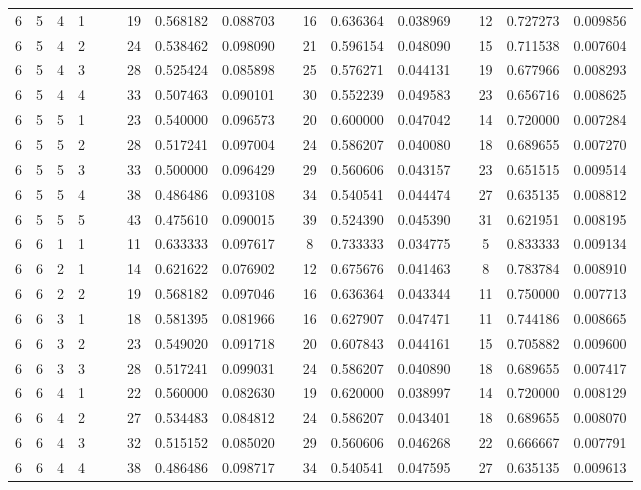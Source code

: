 \begin{appendix}
\begin{longtable}[h]{rrrcccccccccccccc}
6	&	5	&	4	&	1	&&&	19	&	0.568182	&	0.088703	&&	16	&	0.636364	&	0.038969	&&	12	&	0.727273	&	0.009856	\\
6	&	5	&	4	&	2	&&&	24	&	0.538462	&	0.098090	&&	21	&	0.596154	&	0.048090	&&	15	&	0.711538	&	0.007604	\\
6	&	5	&	4	&	3	&&&	28	&	0.525424	&	0.085898	&&	25	&	0.576271	&	0.044131	&&	19	&	0.677966	&	0.008293	\\
6	&	5	&	4	&	4	&&&	33	&	0.507463	&	0.090101	&&	30	&	0.552239	&	0.049583	&&	23	&	0.656716	&	0.008625	\\
6	&	5	&	5	&	1	&&&	23	&	0.540000	&	0.096573	&&	20	&	0.600000	&	0.047042	&&	14	&	0.720000	&	0.007284	\\
6	&	5	&	5	&	2	&&&	28	&	0.517241	&	0.097004	&&	24	&	0.586207	&	0.040080	&&	18	&	0.689655	&	0.007270	\\
6	&	5	&	5	&	3	&&&	33	&	0.500000	&	0.096429	&&	29	&	0.560606	&	0.043157	&&	23	&	0.651515	&	0.009514	\\
6	&	5	&	5	&	4	&&&	38	&	0.486486	&	0.093108	&&	34	&	0.540541	&	0.044474	&&	27	&	0.635135	&	0.008812	\\
6	&	5	&	5	&	5	&&&	43	&	0.475610	&	0.090015	&&	39	&	0.524390	&	0.045390	&&	31	&	0.621951	&	0.008195	\\
6	&	6	&	1	&	1	&&&	11	&	0.633333	&	0.097617	&&	8	&	0.733333	&	0.034775	&&	5	&	0.833333	&	0.009134	\\
6	&	6	&	2	&	1	&&&	14	&	0.621622	&	0.076902	&&	12	&	0.675676	&	0.041463	&&	8	&	0.783784	&	0.008910	\\
6	&	6	&	2	&	2	&&&	19	&	0.568182	&	0.097046	&&	16	&	0.636364	&	0.043344	&&	11	&	0.750000	&	0.007713	\\
6	&	6	&	3	&	1	&&&	18	&	0.581395	&	0.081966	&&	16	&	0.627907	&	0.047471	&&	11	&	0.744186	&	0.008665	\\
6	&	6	&	3	&	2	&&&	23	&	0.549020	&	0.091718	&&	20	&	0.607843	&	0.044161	&&	15	&	0.705882	&	0.009600	\\
6	&	6	&	3	&	3	&&&	28	&	0.517241	&	0.099031	&&	24	&	0.586207	&	0.040890	&&	18	&	0.689655	&	0.007417	\\
6	&	6	&	4	&	1	&&&	22	&	0.560000	&	0.082630	&&	19	&	0.620000	&	0.038997	&&	14	&	0.720000	&	0.008129	\\
6	&	6	&	4	&	2	&&&	27	&	0.534483	&	0.084812	&&	24	&	0.586207	&	0.043401	&&	18	&	0.689655	&	0.008070	\\
6	&	6	&	4	&	3	&&&	32	&	0.515152	&	0.085020	&&	29	&	0.560606	&	0.046268	&&	22	&	0.666667	&	0.007791	\\
6	&	6	&	4	&	4	&&&	38	&	0.486486	&	0.098717	&&	34	&	0.540541	&	0.047595	&&	27	&	0.635135	&	0.009613	\\

\end{longtable}
\end{appendix}
